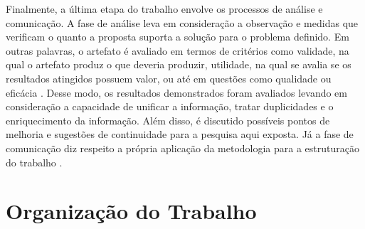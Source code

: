 Finalmente, a última etapa do trabalho envolve os processos de análise e comunicação. A fase de análise leva em consideração a observação e medidas que verificam o quanto a proposta suporta a solução para o problema definido. Em outras palavras, o artefato é avaliado em termos de critérios como validade, na qual o artefato produz o que deveria produzir, utilidade, na qual se avalia se os resultados atingidos possuem valor, ou até em questões como qualidade ou eficácia \citep{Gregor2013}. Desse modo, os resultados demonstrados foram avaliados levando em consideração a capacidade de unificar a informação, tratar duplicidades e o enriquecimento da informação. Além disso, é discutido possíveis pontos de melhoria e sugestões de continuidade para a pesquisa aqui exposta. Já a fase de comunicação diz respeito a própria aplicação da metodologia para a estruturação do trabalho \citep{Peffers2007}.

\section{Organização do Trabalho}
\label{sec:organizacao_trabalho}

